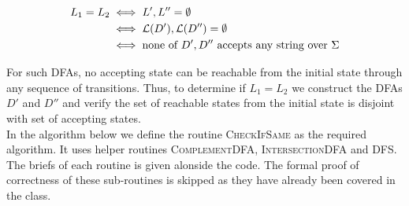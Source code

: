 \begin{soln}
\begin{align*}
    L_1 = L_2 &\iff L', L'' = \emptyset\\
              &\iff \mathcal{L}(D'), \mathcal{L}(D'') = \emptyset\\
              &\iff \text{none of } D', D'' \text{ accepts any string over } \Sigma
\end{align*}


For such DFAs, no accepting state can be reachable from the initial state through any sequence of transitions. Thus, to determine if $L_1 = L_2$ we construct the DFAs $D'$ and $D''$ and verify the set of reachable states from the initial state is disjoint with set of accepting states.\\

In the algorithm below we define the routine \textsc{CheckIfSame} as the required algorithm. It uses helper routines \textsc{ComplementDFA}, \textsc{IntersectionDFA} and \textsc{DFS}. The briefs of each routine is given alonside the code. The formal proof of correctness of these sub-routines is skipped as they have already been covered in the class.\\


\end{soln}
